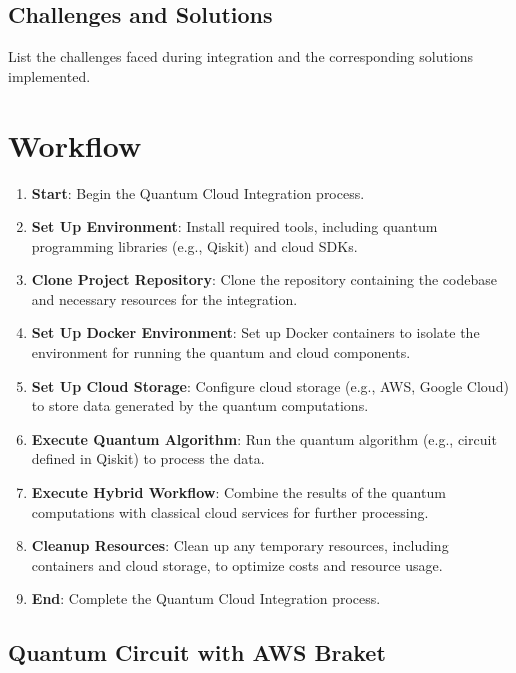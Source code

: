 \documentclass[conference]{IEEEtran}
\begin{document}
\subsection{Challenges and Solutions}
List the challenges faced during integration and the corresponding solutions implemented.

\section{Workflow}
\begin{enumerate}
    \item \textbf{Start}: Begin the Quantum Cloud Integration process.
    \item \textbf{Set Up Environment}: Install required tools, including quantum programming libraries (e.g., Qiskit) and cloud SDKs.
    \item \textbf{Clone Project Repository}: Clone the repository containing the codebase and necessary resources for the integration.
    \item \textbf{Set Up Docker Environment}: Set up Docker containers to isolate the environment for running the quantum and cloud components.
    \item \textbf{Set Up Cloud Storage}: Configure cloud storage (e.g., AWS, Google Cloud) to store data generated by the quantum computations.
    \item \textbf{Execute Quantum Algorithm}: Run the quantum algorithm (e.g., circuit defined in Qiskit) to process the data.
    \item \textbf{Execute Hybrid Workflow}: Combine the results of the quantum computations with classical cloud services for further processing.
    \item \textbf{Cleanup Resources}: Clean up any temporary resources, including containers and cloud storage, to optimize costs and resource usage.
    \item \textbf{End}: Complete the Quantum Cloud Integration process.
\end{enumerate}


\subsection{Quantum Circuit with AWS Braket}
\end{document}

